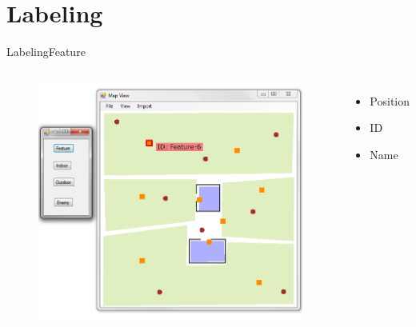 \section{Labeling}

\begin{frame}{Labeling}{Feature}

\begin{columns}
\begin{figure}
\centering
\includegraphics[width = \textwidth]{./screenshot/feature_label.png}
\end{figure}

\begin{minipage}{\textwidth}
\begin{itemize}
\item Position
\item ID
\item Name
\end{itemize}
\end{minipage}
\end{columns}

\end{frame}


